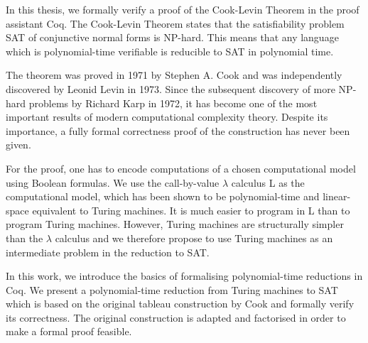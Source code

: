 In this thesis, we formally verify a proof of the Cook-Levin Theorem in the proof assistant Coq.
The Cook-Levin Theorem states that the satisfiability problem SAT of conjunctive normal forms is NP-hard. 
This means that any language which is polynomial-time verifiable is reducible to SAT in polynomial time. 

The theorem was proved in 1971 by Stephen A. Cook and was independently discovered by Leonid Levin in 1973.
Since the subsequent discovery of more NP-hard problems by Richard Karp in 1972, it has become one of the most important results of modern computational complexity theory.
Despite its importance, a fully formal correctness proof of the construction has never been given.

For the proof, one has to encode computations of a chosen computational model using Boolean formulas. 
We use the call-by-value $\lambda$ calculus L as the computational model, which has been shown to be polynomial-time and linear-space equivalent to Turing machines. It is much easier to program in L than to program Turing machines.
However, Turing machines are structurally simpler than the $\lambda$ calculus and we therefore propose to use Turing machines as an intermediate problem in the reduction to SAT.


In this work, we introduce the basics of formalising polynomial-time reductions in Coq. We present a polynomial-time reduction from Turing machines to SAT which is based on the original tableau construction by Cook and formally verify its correctness. The original construction is adapted and factorised in order to make a formal proof feasible.

